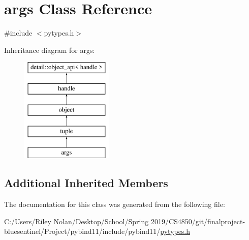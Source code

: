 \hypertarget{classargs}{}\section{args Class Reference}
\label{classargs}


{\ttfamily \#include $<$pytypes.\+h$>$}

Inheritance diagram for args\+:\begin{figure}[H]
\begin{center}
\leavevmode
\includegraphics[height=5.000000cm]{classargs}
\end{center}
\end{figure}
\subsection*{Additional Inherited Members}


The documentation for this class was generated from the following file\+:\begin{DoxyCompactItemize}
\item 
C\+:/\+Users/\+Riley Nolan/\+Desktop/\+School/\+Spring 2019/\+C\+S4850/git/finalproject-\/bluesentinel/\+Project/pybind11/include/pybind11/\mbox{\hyperlink{pytypes_8h}{pytypes.\+h}}\end{DoxyCompactItemize}
